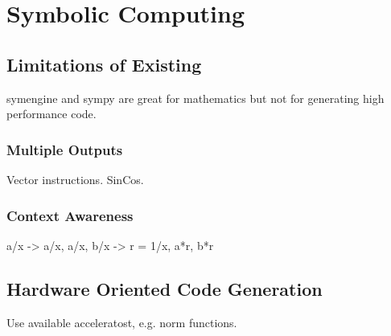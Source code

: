 \section{Symbolic Computing}
\subsection{Limitations of Existing}
\gls{symengine} and \gls{sympy} are great for mathematics but not for generating high performance code.

\subsubsection{Multiple Outputs}
Vector instructions.
SinCos.

\subsubsection{Context Awareness}
a/x -> a/x,   a/x, b/x -> r = 1/x, a*r, b*r

\subsection{Hardware Oriented Code Generation}
Use available acceleratost, e.g. norm functions.


